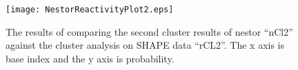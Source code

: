 \begin{figure}[t]
\texttt{[image: NestorReactivityPlot2.eps]}
\caption{The results of comparing the second cluster results of nestor
  ``nCl2'' against the cluster analysis on SHAPE data ``rCL2''. The x
  axis is base index and the y axis is probability.}
\label{fig:nestResults2}
\end{figure}




